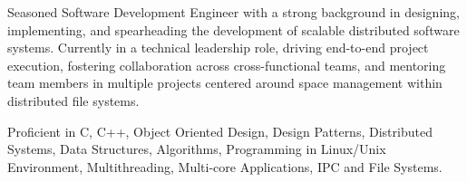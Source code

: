 

\begin{cvparagraph}

 Seasoned Software Development Engineer with a strong background in designing, implementing, and spearheading the development of scalable distributed software systems. Currently in a technical leadership role, driving end-to-end project execution, fostering collaboration across cross-functional teams, and mentoring team members in multiple projects centered around space management within distributed file systems.
\end{cvparagraph}


\begin{cvparagraph}
 Proficient in C, C++, Object Oriented Design, Design Patterns, Distributed Systems, Data Structures, Algorithms, Programming in Linux/Unix Environment, Multithreading, Multi-core Applications, IPC and File Systems.
\end{cvparagraph}
